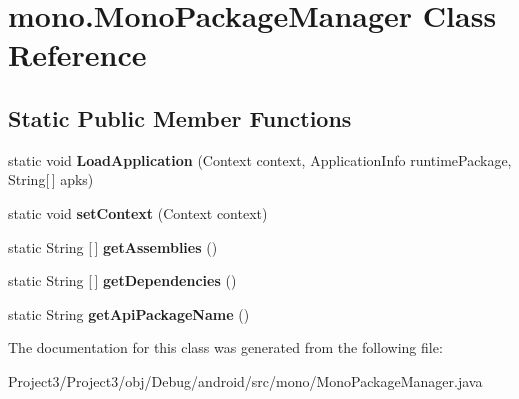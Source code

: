 \hypertarget{classmono_1_1MonoPackageManager}{}\section{mono.\+Mono\+Package\+Manager Class Reference}
\label{classmono_1_1MonoPackageManager}
\subsection*{Static Public Member Functions}
\begin{DoxyCompactItemize}
\item 
\mbox{\label{classmono_1_1MonoPackageManager_a5a2d5fc7f4891ab84e6deeae523686a2}} 
static void {\bfseries Load\+Application} (Context context, Application\+Info runtime\+Package, String\mbox{[}$\,$\mbox{]} apks)
\item 
\mbox{\label{classmono_1_1MonoPackageManager_ad3ff1f574349729b27f86da6c25c0f55}} 
static void {\bfseries set\+Context} (Context context)
\item 
\mbox{\label{classmono_1_1MonoPackageManager_a4db80b0afa9fab894e267e09bc3da334}} 
static String \mbox{[}$\,$\mbox{]} {\bfseries get\+Assemblies} ()
\item 
\mbox{\label{classmono_1_1MonoPackageManager_a708931514353feff12f2cc9d99865a9e}} 
static String \mbox{[}$\,$\mbox{]} {\bfseries get\+Dependencies} ()
\item 
\mbox{\label{classmono_1_1MonoPackageManager_a009d16dedf56862f4a23ee05e180e028}} 
static String {\bfseries get\+Api\+Package\+Name} ()
\end{DoxyCompactItemize}


The documentation for this class was generated from the following file\+:\begin{DoxyCompactItemize}
\item 
Project3/\+Project3/obj/\+Debug/android/src/mono/Mono\+Package\+Manager.\+java\end{DoxyCompactItemize}
